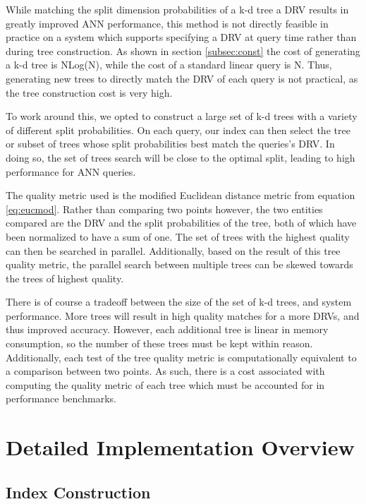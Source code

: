 While matching the split dimension probabilities of a k-d tree a DRV results in greatly improved ANN performance, this method is not directly feasible in practice on a system which supports specifying a DRV at query time rather than during tree construction.  As shown in section \ref{subsec:const} the cost of generating a k-d tree is NLog(N), while the cost of a standard linear query is N.  Thus, generating new trees to directly match the DRV of each query is not practical, as the tree construction cost is very high.

To work around this, we opted to construct a large set of k-d trees with a variety of different split probabilities.  On each query, our index can then select the tree or subset of trees whose split probabilities best match the queries's DRV.  In doing so, the set of trees search will be close to the optimal split, leading to high performance for ANN queries.

The quality metric used is the modified Euclidean distance metric from equation \ref{eq:eucmod}.  Rather than comparing two points however, the two entities compared are the DRV and the split probabilities of the tree, both of which have been normalized to have a sum of one.  The set of trees with the highest quality can then be searched in parallel.  Additionally, based on the result of this tree quality metric, the parallel search between multiple trees can be skewed towards the trees of highest quality.

There is of course a tradeoff between the size of the set of k-d trees, and system performance.  More trees will result in high quality matches for a more DRVs, and thus improved accuracy.  However, each additional tree is linear in memory consumption, so the number of these trees must be kept within reason.  Additionally, each test of the tree quality metric is computationally equivalent to a comparison between two points.  As such, there is a cost associated with computing the quality metric of each tree which must be accounted for in performance benchmarks.

\section{Detailed Implementation Overview}

\subsection{Index Construction}
\label{sec:myalgconst}

